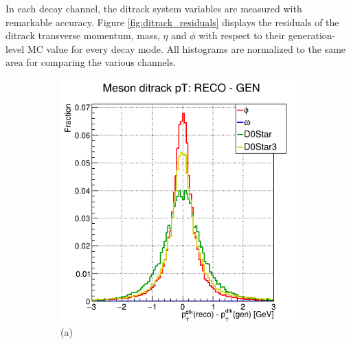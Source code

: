 \begin{myitemlist}
    In each decay channel, the ditrack system variables are measured with remarkable accuracy. Figure \ref{fig:ditrack_residuals} displays the residuals of the ditrack transverse momentum, mass, $\eta$ and $\phi$ with respect to their generation-level MC value for every decay mode. All histograms are normalized to the same area for comparing the various channels.
    \begin{figure}[!ht]
        \captionsetup[subfigure]{labelformat=empty}
        \vspace*{-0.2cm}
        \centering
        \setlength{\mylength}{\textwidth}
        \begin{subfigure}[t]{0.50\mylength}
                \centering
                \includegraphics[width=0.45\mylength]{resources/plots/ditrack_residuals_pt.png}
                \caption{\footnotesize (a)}
        \end{subfigure}%
        \begin{subfigure}[t]{0.50\mylength}
                \centering

\end{subfigure}
\end{figure}
\end{myitemlist}
